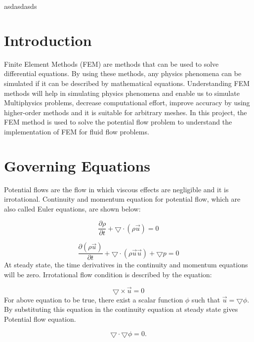 \documentclass[12pt]{elsarticle}
\begin{document}
	asdasdasds
	\section{Introduction}
	\label{S:1}
	
	Finite Element Methods (FEM) are methods that can be used to solve differential equations. By using these methods, any physics phenomena can be simulated if it can be described by mathematical equations. Understanding FEM methods will help in simulating physics phenomena and enable us to simulate Multiphysics problems, decrease computational effort, improve accuracy by using higher-order methods and it is suitable for arbitrary meshes. In this project, the FEM method is used to solve the potential flow problem to understand the implementation of FEM for fluid flow problems. 
	\section{Governing Equations}
	\label{S:2}
	Potential flows are the flow in which viscous effects are negligible and it is irrotational. Continuity and momentum equation for potential flow, which are also called Euler equations, are shown below:
	
	\begin{equation}
		\frac{\partial \rho}{\partial t}+\bigtriangledown \cdot(\rho \overrightarrow{u})=0
	\end{equation}
	
	\begin{equation}
		\frac{\partial (\rho \overrightarrow{u})}{\partial t}+\bigtriangledown \cdot (\rho \overrightarrow{u} \overrightarrow{u})+\bigtriangledown p =0
	\end{equation}
	At steady state, the time derivatives in the continuity and momentum equations will be zero. Irrotational flow condition is described by the equation:
	
	\begin{equation}
		\bigtriangledown \times \overrightarrow{u}=0
	\end{equation}
	For above equation to be true, there exist a scalar function $\phi$ such that $\overrightarrow{u}=\bigtriangledown \phi$. By substituting this equation in the continuity equation at steady state gives Potential flow equation.
	
	\begin{equation}\label{laplace equation}
		\bigtriangledown \cdot \bigtriangledown \phi=0.
	\end{equation}
	
\end{document}
